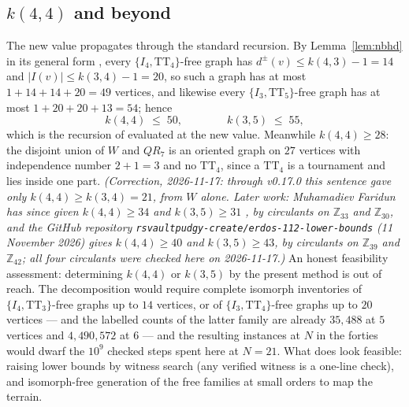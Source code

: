 \documentclass[11pt]{amsart}
\newcommand{\TT}[1]{\mathrm{TT}_{#1}}
\newcommand{\I}[1]{I_{#1}}
\newcommand{\NI}{I}
\theoremstyle{plain}
\theoremstyle{definition}
\theoremstyle{remark}
\begin{document}
\subsection{$k(4,4)$ and beyond}\label{ssec:qk44}
The new value propagates through the standard recursion. By
Lemma~\ref{lem:nbhd} in its general form \cite[Lemma~2.1]{IRW21},
every $\{\I4,\TT{4}\}$-free graph has $d^{\pm}(v)\le k(4,3)-1=14$ and
$|\NI(v)|\le k(3,4)-1=20$, so such a graph has at most
$1+14+14+20=49$ vertices, and likewise every $\{\I3,\TT{5}\}$-free
graph has at most $1+20+20+13=54$; hence
\[
k(4,4)\;\le\;50,
\qquad\qquad
k(3,5)\;\le\;55 ,
\]
which is the recursion of \cite[Lemma~2.3]{IRW21} evaluated at the new
value. Meanwhile $k(4,4)\ge 28$: the disjoint union of $W$ and $QR_7$ is
an oriented graph on $27$ vertices with independence number $2+1=3$ and
no $\TT{4}$, since a $\TT{4}$ is a tournament and lies inside one part.
\emph{(Correction, 2026-11-17: through v0.17.0 this sentence gave only
$k(4,4)\ge k(3,4)=21$, from $W$ alone. Later work: Muhamadiev Faridun has
since given $k(4,4)\ge 34$ and $k(3,5)\ge 31$ \cite{MF26}, by circulants
on $\mathbb{Z}_{33}$ and $\mathbb{Z}_{30}$, and the GitHub repository
\texttt{rsvaultpudgy-create/erdos-112-lower-bounds} (11 November 2026) gives
$k(4,4)\ge 40$ and $k(3,5)\ge 43$, by circulants on $\mathbb{Z}_{39}$ and
$\mathbb{Z}_{42}$; all four circulants were checked here on 2026-11-17.)} An honest feasibility assessment:
determining $k(4,4)$ or $k(3,5)$ by the present method is out of reach.
The decomposition would require complete isomorph inventories of
$\{\I4,\TT{3}\}$-free graphs up to $14$ vertices, or of
$\{\I3,\TT{4}\}$-free graphs up to $20$ vertices --- and the labelled
counts of the latter family are already $35{,}488$ at $5$ vertices and
$4{,}490{,}572$ at $6$ --- and the resulting instances at $N$ in the
forties would dwarf the $10^9$ checked steps spent here at $N=21$. What
does look feasible: raising lower bounds by witness search (any
verified witness is a one-line check), and isomorph-free generation of
the free families at small orders to map the terrain.
\end{document}
